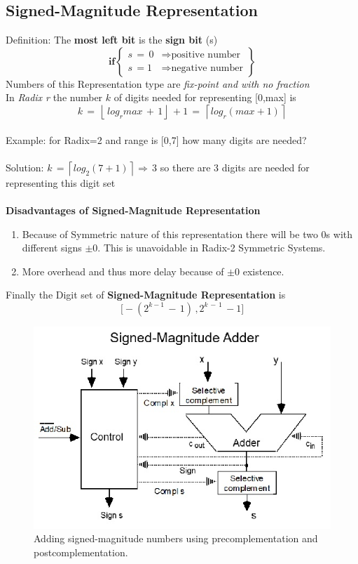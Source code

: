 \subsection{Signed-Magnitude Representation}
Definition: The \textbf{most left bit} is the \textbf{sign bit} (s) \[
	\mathbf{if}
\left\{\begin{array}{cl}
	s\,=\,0 & \Longrightarrow \text{positive number}\\s\,=1 & \Longrightarrow \text{negative number} 
\end{array}\right\}
\]
Numbers of this Representation type are \textit{fix-point and with no fraction}\\
In \textit{Radix r} the number \(k\)  of digits needed for representing [0,max] is
\[
	k\,=\,\left\lfloor\,log_{r}max\,+\,1 \right\rfloor\,+1\,=\,\left\lceil log_{r}(max+1) \right\rceil 
\]
\\
Example: for Radix=2 and range is [0,7] how many digits are needed?
\\\\Solution: \(k\,=\left\lceil log_{2}(7+1) \right\rceil \Longrightarrow\, 3\) so there are 3 digits are needed for representing this digit set\\\\
\textbf{Disadvantages of Signed-Magnitude Representation}
\begin{enumerate}
	\item Because of Symmetric nature of this representation there will be two \(0\)s with different signs \(\pm0\). This is unavoidable in Radix-2 Symmetric Systems.
	\item More overhead and thus more delay because of \(\pm0\) existence.
\end{enumerate}
Finally the Digit set of \textbf{Signed-Magnitude Representation} is 
\[
	\big[-(2^{k-1}\,-\,1)\,,2^{k\,-\,1}\,-1\big]
\]
\begin{figure}
	\centering
	\includegraphics{smadder.jpg}
	\caption[short]{Adding signed-magnitude numbers using precomplementation and postcomplementation.}
\end{figure}

